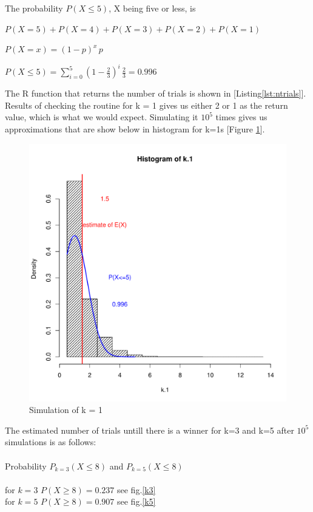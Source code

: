 \documentclass[a4paper, 11pt]{article}
\begin{document}
The probability $ P(X \leq 5) $, X being five or less, is
\begin{center}$ P(X=5) + P(X=4) + P(X=3) + P(X=2) + P(X=1)  $\end{center}
\begin{center}$ P(X=x)=(1-p)^{x}\,p\,  $\end{center}
\begin{center}$ P(X\leq5) = \sum_{i=0}^{5} (1-\frac{2}{3})^{i}\,\frac{2}{3} = 0.996$\end{center}

The R function that returns the number of trials is shown in [Listing\ref{lst:ntrials}]. Results of checking the routine for k = 1 gives us either 2 or 1 as the return value, which is what we would expect. Simulating it $10^5$ times gives us approximations that are show below in histogram for k=1s [Figure \ref{k1}].
\begin{figure}[H]
  \centering
  \includegraphics[scale=0.7,page=1]{Rplots.pdf}
  \caption{Simulation of k = 1}
  \label{k1}
\end{figure}


The estimated number of trials untill there is a winner for k=3 and k=5 after $10^5$ simulations is as follows:
\\\\
Probability $ P_{k=3}(X\leq8) $ and $ P_{k=5}(X\leq8) $
\\\\
for $k=3$ $ P(X\geq8) = 0.237 $ see fig.\ref{k3}
\\
for $k=5$ $ P(X\geq8) = 0.907 $ see fig.\ref{k5}
\end{document}
